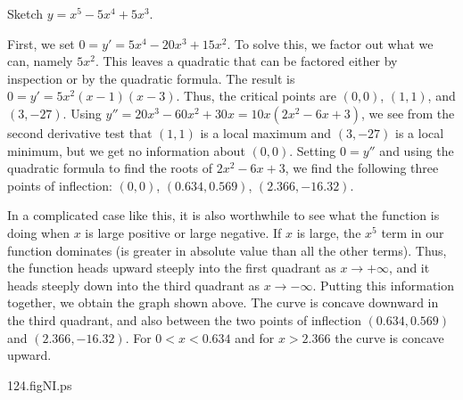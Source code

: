 \begin{example}

Sketch $y=x^5-5x^4+5x^3$.

\smallskip

First, we set $0=y'=5x^4-20x^3+15x^2$.  To solve this, we factor out what
we can, namely $5x^2$.  This leaves a quadratic that can be factored either
by inspection or by the quadratic formula.  The result is
$0=y'=5x^2(x-1)(x-3)$.  Thus, the critical points are $(0,0)$, $(1,1)$, and
$(3,-27)$.  Using $y''=20x^3-60x^2+30x=10x(2x^2-6x+3)$, we see from the
second derivative test that $(1,1)$ is a local maximum and $(3,-27)$ is a
local minimum, but we get no information about $(0,0)$.  Setting $0=y''$
and using the quadratic formula to find the roots of $2x^2-6x+3$, we find
the following three points of inflection: $(0,0)$, $(0.634,0.569)$,
$(2.366,-16.32)$.

\begin{rightindent}{3.0in}
\noindent
  In a complicated case like
this, it is also worthwhile to see what the function is doing when $x$ is
large positive or large negative.  If $x$ is large, the $x^5$ term in our
function dominates (is greater in absolute value than all the other terms).
Thus, the function heads upward steeply into the first quadrant as
$x\longrightarrow+\infty$, and it heads steeply down into the third
quadrant as $x\longrightarrow-\infty$.  Putting this information together,
we obtain the graph shown above.  The curve is concave downward in the
third quadrant, and also between the two points of inflection
$(0.634,0.569)$ and $(2.366,-16.32)$.  For $0<x<0.634$ and for $x>2.366$
the curve is concave upward.
\end{rightindent}
\hfill
%
\begin{psfigure}{2.45in}{2.5in}{124.figNI.ps}
\end{psfigure}

\end{example}

\newpage

